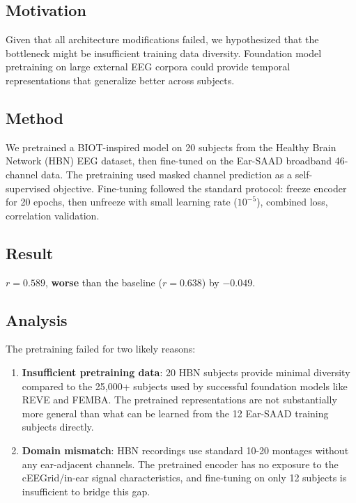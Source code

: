 \documentclass[11pt,a4paper]{article}
\begin{document}
\subsection{Motivation}

Given that all architecture modifications failed, we hypothesized that
the bottleneck might be insufficient training data diversity. Foundation
model pretraining on large external EEG corpora could provide temporal
representations that generalize better across subjects.

\subsection{Method}

We pretrained a BIOT-inspired model on 20 subjects from the Healthy Brain
Network (HBN) EEG dataset, then fine-tuned on the Ear-SAAD broadband
46-channel data. The pretraining used masked channel prediction as a
self-supervised objective. Fine-tuning followed the standard protocol:
freeze encoder for 20 epochs, then unfreeze with small learning rate
($10^{-5}$), combined loss, correlation validation.

\subsection{Result}

$r = 0.589$, \textbf{worse} than the baseline ($r = 0.638$) by
$-0.049$.

\subsection{Analysis}

The pretraining failed for two likely reasons:
\begin{enumerate}
  \item \textbf{Insufficient pretraining data}: 20 HBN subjects provide
    minimal diversity compared to the 25,000+ subjects used by successful
    foundation models like REVE and FEMBA. The pretrained representations
    are not substantially more general than what can be learned from the
    12 Ear-SAAD training subjects directly.
  \item \textbf{Domain mismatch}: HBN recordings use standard 10-20
    montages without any ear-adjacent channels. The pretrained encoder
    has no exposure to the cEEGrid/in-ear signal characteristics, and
    fine-tuning on only 12 subjects is insufficient to bridge this gap.
\end{enumerate}
\end{document}
